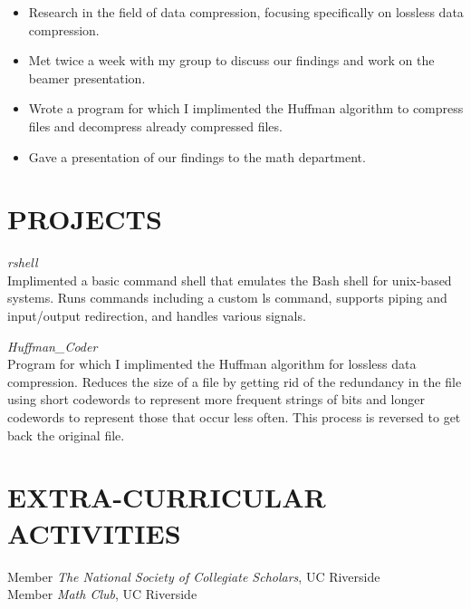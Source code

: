 \documentclass[margin, 10pt]{res}
\begin{document}
\begin{resume}
\begin{itemize} \itemsep -2pt 
\item Research in the field of data compression, focusing specifically on lossless data compression.
\item Met twice a week with my group to discuss our findings and work on the beamer presentation.
\item Wrote a program for which I implimented the Huffman algorithm to compress files and decompress already compressed files.
\item Gave a presentation of our findings to the math department.
\end{itemize}

\section{PROJECTS}

{\sl rshell} \\
Implimented a basic command shell that emulates the Bash shell for unix-based systems. Runs commands including a custom ls command, supports piping and input/output redirection, and handles various signals. 

{\sl Huffman\_Coder} \\
Program for which I implimented the Huffman algorithm for lossless data compression. Reduces the size of a file by getting rid of the redundancy in the file using short codewords to represent more frequent strings of bits and longer codewords to represent those that occur less often. This process is reversed to get back the original file.

\section{EXTRA-CURRICULAR \\ ACTIVITIES} 

Member {\it The National Society of Collegiate Scholars}, UC Riverside \\
Member {\it Math Club}, UC Riverside

\end{resume}
\end{document}
